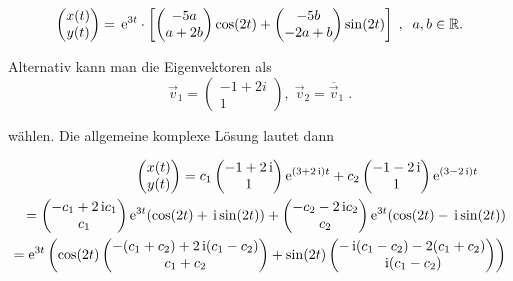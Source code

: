 {\begin{iii}
\begin{align*}
\begin{pmatrix} x(t)\\y(t)\end{pmatrix}
 =\,\text{e}^{3t}\cdot \left[  
\begin{pmatrix}
-5a \\ 
a+2b
\end{pmatrix}
 \cos (2t)+ 
\begin{pmatrix}
-5b \\ 
-2a+b
\end{pmatrix}
 \sin (2t)\right] \;,\;\;a,b\in \mathbb{R}.
\end{align*}
\newline

Alternativ kann man die Eigenvektoren als
\[\vec{v}_{1}=\begin{pmatrix}
-1+2i \\ 1
\end{pmatrix},
\;\vec{v}_{2}=\overline{\vec{v}}_{1}\;. 
\]

wählen.
Die allgemeine komplexe Lösung lautet dann

\begin{align*}
\begin{pmatrix}
x(t) \\ 
y(t)
\end{pmatrix}
= c_1\begin{pmatrix} -1+2\,\mathrm{i} \\1\end{pmatrix}
 \mathrm{e}^{(3+2\,\mathrm{i})t}+c_2 \begin{pmatrix} -1-2\,\mathrm{i} \\1\end{pmatrix}
 \mathrm{e}^{(3-2\,\mathrm{i})t}\qquad\\
= \begin{pmatrix} -c_1+2\,\mathrm{i} c_1 \\c_1\end{pmatrix}
\mathrm{e}^{3t}(\cos(2t) + \,\mathrm{i} \sin(2t))+\begin{pmatrix} -c_2-2\,\mathrm{i} c_2 \\c_2\end{pmatrix}
\mathrm{e}^{3t}(\cos(2t) - \,\mathrm{i} \sin(2t))\\
= \mathrm{e}^{3t}\left(\cos(2t)\begin{pmatrix} -(c_1+c_2) +2\,\mathrm{i}(c_1-c_2)\\c_1+c_2\end{pmatrix} 
+ \sin(2t)\begin{pmatrix}-\,\mathrm{i}(c_1-c_2)-2(c_1+c_2)\\\,\mathrm{i}(c_1-c_2)\end{pmatrix}\right)
\end{align*}


\end{iii}}
